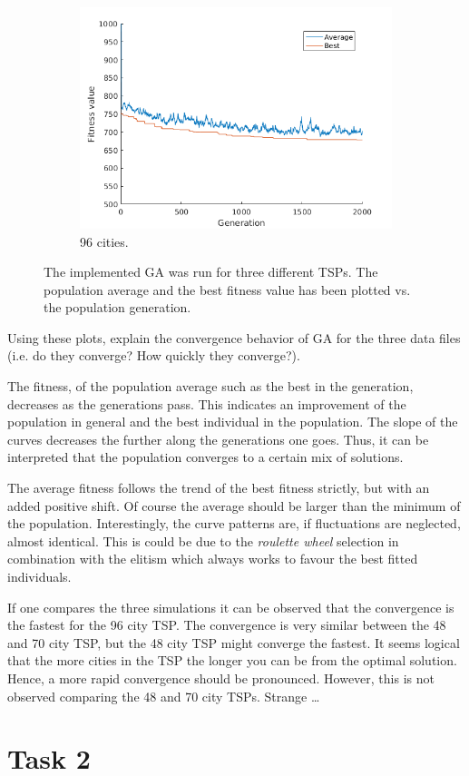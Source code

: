 \documentclass[]{article}
\begin{document}
\begin{figure}[H]
  \begin{subfigure}{\textwidth}
     \centering
     \includegraphics[width=0.5\linewidth]{../GA_TSP/t196.png}
     \caption{96 cities.}
     \label{sfig:t196}
  \end{subfigure}%
  \caption{The implemented GA was run for three different TSPs. The population average and the best fitness value has been plotted vs. the population generation.}
  \label{fig:task1}
\end{figure}

Using these plots, explain the convergence behavior of GA for the three data files (i.e. do they converge? How quickly they converge?).

The fitness, of the population average such as the best in the generation, decreases as the generations pass.
This indicates an improvement of the population in general and the best individual in the population.
The slope of the curves decreases the further along the generations one goes.
Thus, it can be interpreted that the population converges to a certain mix of solutions.

The average fitness follows the trend of the best fitness strictly, but with an added positive shift.
Of course the average should be larger than the minimum of the population.
Interestingly, the curve patterns are, if fluctuations are neglected, almost identical.
This is could be due to the {\it roulette wheel} selection in combination with the elitism which always works to favour the best fitted individuals.

If one compares the three simulations it can be observed that the convergence is the fastest for the 96 city TSP.
The convergence is very similar between the 48 and 70 city TSP, but the 48 city TSP might converge the fastest.
It seems logical that the more cities in the TSP the longer you can be from the optimal solution.
Hence, a more rapid convergence should be pronounced.
However, this is not observed comparing the 48 and 70 city TSPs.
Strange \dots



\section*{Task 2}
\end{document}
